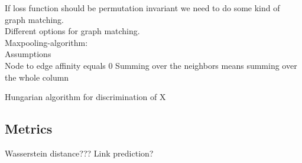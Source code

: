 If loss function should be permutation invariant we need to do some kind of graph matching.\\
Different options for graph matching.\\
Maxpooling-algorithm:\\
Assumptions\\
Node to edge affinity equals 0
Summing over the neighbors means summing over the whole column

Hungarian algorithm for discrimination of X
\\

\subsection{Metrics}

Wasserstein distance???
Link prediction?
